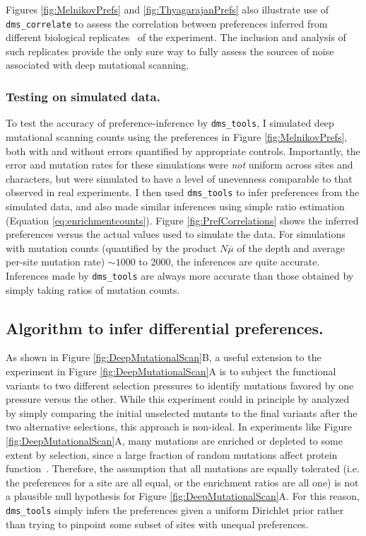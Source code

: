 \documentclass[twocolumn]{bmcart}%
\begin{document}
Figures \ref{fig:MelnikovPrefs} and \ref{fig:ThyagarajanPrefs} also illustrate use of \texttt{dms\_correlate} to assess the correlation between preferences inferred from different biological replicates~\cite{blainey2014points} of the experiment. The inclusion and analysis of such replicates provide the only sure way to fully assess the sources of noise associated with deep mutational scanning.

\subsubsection*{Testing on simulated data.}
To test the accuracy of preference-inference by \texttt{dms\_tools}, I simulated deep mutational scanning counts using the preferences in Figure \ref{fig:MelnikovPrefs}, both with and without errors quantified by appropriate controls. Importantly, the error and mutation rates for these simulations were \emph{not} uniform across sites and characters, but were simulated to have a level of unevenness comparable to that observed in real experiments. I then used \texttt{dms\_tools} to infer preferences from the simulated data, and also made similar inferences using simple ratio estimation (Equation \ref{eq:enrichmentcounts}). Figure \ref{fig:PrefCorrelations} shows the inferred preferences versus the actual values used to simulate the data. For simulations with mutation counts (quantified by the product $N\overline{\mu}$ of the depth and average per-site mutation rate) $\sim 1000$ to 2000, the inferences are quite accurate. Inferences made by \texttt{dms\_tools} are always more accurate than those obtained by simply taking ratios of mutation counts.

\subsection*{Algorithm to infer differential preferences.}
As shown in Figure \ref{fig:DeepMutationalScan}B, a useful extension to the experiment in Figure \ref{fig:DeepMutationalScan}A is to subject the functional variants to two different selection pressures to identify mutations favored by one pressure versus the other. While this experiment could in principle by analyzed by simply comparing the initial unselected mutants to the final variants after the two alternative selections, this approach is non-ideal. In experiments like Figure \ref{fig:DeepMutationalScan}A, many mutations are enriched or depleted to some extent by selection, since a large fraction of random mutations affect protein function~\cite{shortle1985,rennell1991,shafikhani1997,guo2004,bloom2005}. Therefore, the assumption that all mutations are equally tolerated (i.e. the preferences for a site are all equal, or the enrichment ratios are all one) is not a plausible null hypothesis for Figure \ref{fig:DeepMutationalScan}A. For this reason, \texttt{dms\_tools} simply infers the preferences given a uniform Dirichlet prior rather than trying to pinpoint some subset of sites with unequal preferences. 
\end{document}
